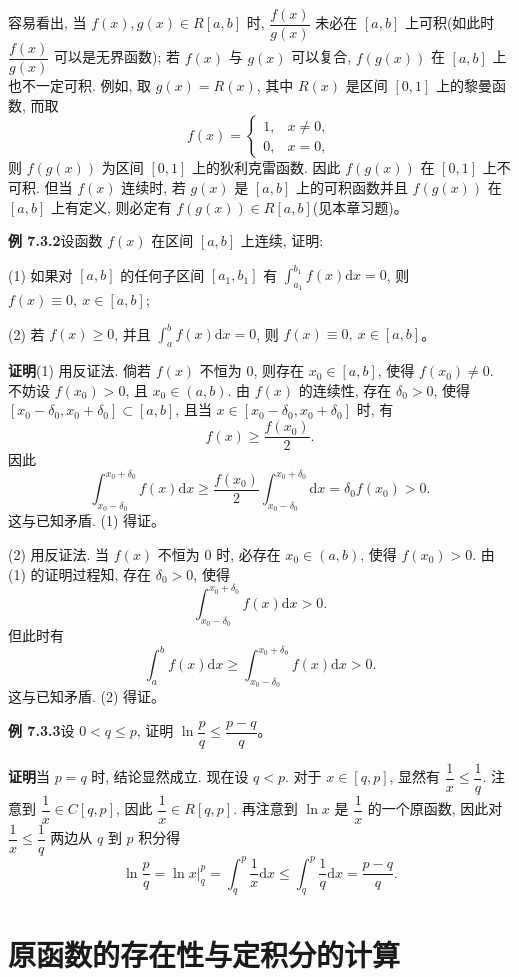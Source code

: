 \documentclass[UTF8, 12pt, fontset=fandol, oneside]{ctexart}
\begin{document}
容易看出, 当 $f(x),g(x)\in R[a,b]$ 时, $\dfrac{f(x)}{g(x)}$ 未必在 $[a,b]$ 上可积(如此时 $\dfrac{f(x)}{g(x)}$ 可以是无界函数); 若 $f(x)$ 与 $g(x)$ 可以复合, $f(g(x))$ 在 $[a,b]$ 上也不一定可积. 例如, 取 $g(x)=R(x)$, 其中 $R(x)$ 是区间 $[0,1]$ 上的黎曼函数, 而取
\[
  f(x)=
  \begin{cases}
    1, & x\neq0,\\
    0, & x=0,
  \end{cases}
\]
则 $f(g(x))$ 为区间 $[0,1]$ 上的狄利克雷函数. 因此 $f(g(x))$ 在 $[0,1]$ 上不可积. 但当 $f(x)$ 连续时, 若 $g(x)$ 是 $[a,b]$ 上的可积函数并且 $f(g(x))$ 在 $[a,b]$ 上有定义, 则必定有 $f(g(x))\in R[a,b]$(见本章习题)。

\noindent\textbf{例 7.3.2}\quad 设函数 $f(x)$ 在区间 $[a,b]$ 上连续, 证明:

(1) 如果对 $[a,b]$ 的任何子区间 $[a_1,b_1]$ 有 $\int_{a_1}^{b_1}f(x)\mathrm dx=0$, 则 $f(x)\equiv0,\ x\in[a,b]$;

(2) 若 $f(x)\geq0$, 并且 $\int_a^b f(x)\mathrm dx=0$, 则 $f(x)\equiv0,\ x\in[a,b]$。

\noindent\textbf{证明}\quad (1) 用反证法. 倘若 $f(x)$ 不恒为 $0$, 则存在 $x_0\in[a,b]$, 使得 $f(x_0)\neq0$. 不妨设 $f(x_0)>0$, 且 $x_0\in(a,b)$. 由 $f(x)$ 的连续性, 存在 $\delta_0>0$, 使得 $[x_0-\delta_0,x_0+\delta_0]\subset[a,b]$, 且当 $x\in[x_0-\delta_0,x_0+\delta_0]$ 时, 有
\[
  f(x)\geq\frac{f(x_0)}{2}.
\]
因此
\[
  \int_{x_0-\delta_0}^{x_0+\delta_0} f(x)\mathrm dx
  \geq \frac{f(x_0)}{2}\int_{x_0-\delta_0}^{x_0+\delta_0}\mathrm dx
  =\delta_0f(x_0)>0.
\]
这与已知矛盾. (1) 得证。

(2) 用反证法. 当 $f(x)$ 不恒为 $0$ 时, 必存在 $x_0\in(a,b)$, 使得 $f(x_0)>0$. 由 (1) 的证明过程知, 存在 $\delta_0>0$, 使得
\[
  \int_{x_0-\delta_0}^{x_0+\delta_0} f(x)\mathrm dx>0.
\]
但此时有
\[
  \int_a^b f(x)\mathrm dx\geq \int_{x_0-\delta_0}^{x_0+\delta_0} f(x)\mathrm dx>0.
\]
这与已知矛盾. (2) 得证。

\noindent\textbf{例 7.3.3}\quad 设 $0<q\leq p$, 证明 $\ln\dfrac{p}{q}\leq\dfrac{p-q}{q}$。

\noindent\textbf{证明}\quad 当 $p=q$ 时, 结论显然成立. 现在设 $q<p$. 对于 $x\in[q,p]$, 显然有 $\dfrac{1}{x}\leq\dfrac{1}{q}$. 注意到 $\dfrac{1}{x}\in C[q,p]$, 因此 $\dfrac{1}{x}\in R[q,p]$. 再注意到 $\ln x$ 是 $\dfrac{1}{x}$ 的一个原函数, 因此对 $\dfrac{1}{x}\leq\dfrac{1}{q}$ 两边从 $q$ 到 $p$ 积分得
\[
  \ln\frac{p}{q}=\ln x\bigg|_q^p=\int_q^p\frac{1}{x}\mathrm dx
  \leq \int_q^p\frac{1}{q}\mathrm dx=\frac{p-q}{q}.
\]

\section{原函数的存在性与定积分的计算}
\end{document}
